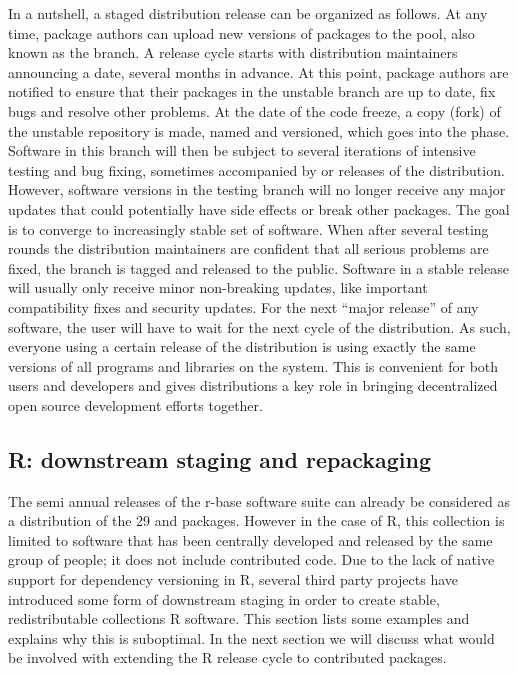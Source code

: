 In a nutshell, a staged distribution release can be organized as follows. At any
time, package authors can upload new versions of packages to the 
pool, also known as the  branch. A release cycle starts with
distribution maintainers announcing a  date, several
months in advance. At this point, package authors are notified to ensure
that their packages in the unstable branch are up to date, fix bugs and resolve
other problems. At the date of the code freeze, a copy (fork) of the unstable
repository is made, named and versioned, which goes into the 
phase. Software in this branch will then be subject to several iterations of
intensive testing and bug fixing, sometimes accompanied by  or
 releases of the distribution. However, software versions in the testing branch will
no longer receive any major updates that could potentially have side effects
or break other packages. The goal is to converge to increasingly stable set of
software. When after several testing rounds the distribution maintainers are
confident that all serious problems are fixed, the branch is tagged 
and released to the public. Software in a stable release will usually only
receive minor non-breaking updates, like important compatibility fixes and
security updates. For the next ``major release'' of any software, the user will
have to wait for the next cycle of the distribution. As such, everyone using a
certain release of the distribution is using exactly the same versions of all programs
and libraries on the system. This is convenient for both users and developers
and gives distributions a key role in bringing decentralized open source
development efforts together.

\subsection{R: downstream staging and repackaging}

The semi annual releases of the r-base software suite can already be considered
as a distribution of the 29  and  packages.
However in the case of R, this collection is limited to software that has been centrally
developed and released by the same group of people; it does not include contributed
code. Due to the lack of native support for dependency versioning in
R, several third party projects have introduced some form of downstream staging in order to
create stable, redistributable collections R software. This section lists some
examples and explains why this is suboptimal. In the next section we will
discuss what would be involved with extending the R release cycle to contributed
packages.


